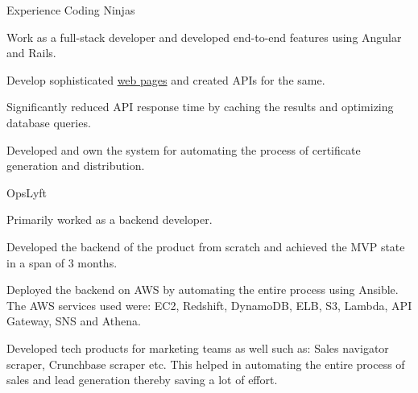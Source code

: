 \documentclass[]{resume-knyte}
\begin{document}
\begin{topic}{Experience}
    {Coding Ninjas}
    {\begin{tightitemize}
        \item Work as a full-stack developer and developed end-to-end features using Angular and Rails.
        \item Develop sophisticated \href{https://www.codingninjas.com/courses/premium-foundation-course}{web pages} and created APIs for the same.
        \item Significantly reduced API response time by caching the results and optimizing database queries.
        \item Developed and own the system for automating the process of certificate generation and distribution.
    \end{tightitemize}}
    {OpsLyft}
    {\begin{tightitemize}
        \item Primarily worked as a backend developer.
        \item Developed the backend of the product from scratch and achieved the MVP state in a span of 3 months.
        \item Deployed the backend on AWS by automating the entire process using Ansible. The AWS services used were: EC2, Redshift, DynamoDB, ELB, S3, Lambda, API Gateway, SNS and Athena.
        \item Developed tech products for marketing teams as well such as: Sales navigator scraper, Crunchbase scraper etc. This helped in automating the entire process of sales and lead generation thereby saving a lot of effort.
    \end{tightitemize}}
\end{topic}
\end{document}
